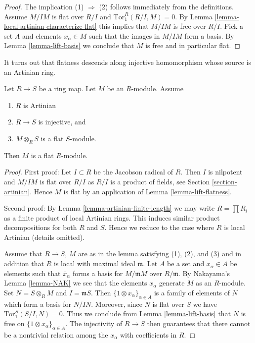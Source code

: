 \begin{proof}
The implication (1) $\Rightarrow$ (2) follows immediately from the
definitions. Assume $M/IM$ is flat over $R/I$ and
$\text{Tor}_1^R(R/I, M) = 0$. By
Lemma \ref{lemma-local-artinian-characterize-flat}
this implies that $M/IM$ is free over $R/I$. Pick a set $A$
and elements $x_\alpha \in M$ such that the images in $M/IM$ form
a basis. By
Lemma \ref{lemma-lift-basis}
we conclude that $M$ is free and in particular flat.
\end{proof}

\noindent
It turns out that flatness descends along injective homomorphism
whose source is an Artinian ring.

\begin{lemma}
\label{lemma-descent-flatness-injective-map-artinian-rings}
Let $R \to S$ be a ring map. Let $M$ be an $R$-module.
Assume
\begin{enumerate}
\item $R$ is Artinian
\item $R \to S$ is injective, and
\item $M \otimes_R S$ is a flat $S$-module.
\end{enumerate}
Then $M$ is a flat $R$-module.
\end{lemma}

\begin{proof}
First proof: Let $I \subset R$ be the Jacobson radical of $R$.
Then $I$ is nilpotent and $M/IM$ is flat over $R/I$ as $R/I$
is a product of fields, see
Section \ref{section-artinian}.
Hence $M$ is flat by an application of
Lemma \ref{lemma-lift-flatness}.

\medskip\noindent
Second proof: By
Lemma \ref{lemma-artinian-finite-length}
we may write $R = \prod R_i$ as a finite product of local Artinian
rings. This induces similar product decompositions for both $R$ and $S$.
Hence we reduce to the case where $R$ is local Artinian (details omitted).

\medskip\noindent
Assume that $R \to S$, $M$ are as in the lemma satisfying (1), (2), and (3)
and in addition that $R$ is local with maximal ideal $\mathfrak m$.
Let $A$ be a set and $x_\alpha \in A$ be elements such that
$\overline{x}_\alpha$ forms a basis for $M/\mathfrak mM$
over $R/\mathfrak m$. By
Nakayama's Lemma \ref{lemma-NAK}
we see that the elements $x_\alpha$ generate $M$ as an $R$-module.
Set $N = S \otimes_R M$ and $I = \mathfrak mS$.
Then $\{1 \otimes x_\alpha\}_{\alpha \in A}$ is a family of elements
of $N$ which form a basis for $N/IN$. Moreover, since $N$ is flat over
$S$ we have $\text{Tor}_1^S(S/I, N) = 0$. Thus we conclude from
Lemma \ref{lemma-lift-basis}
that $N$ is free on $\{1 \otimes x_\alpha\}_{\alpha \in A}$.
The injectivity of $R \to S$ then guarantees that there cannot be a
nontrivial relation among the $x_\alpha$ with coefficients in $R$.
\end{proof}

